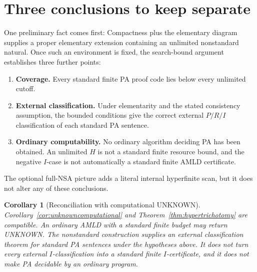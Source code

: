 \documentclass[11pt,openany]{book}
\newtheorem{corollary}[theorem]{Corollary}
\theoremstyle{definition}
\theoremstyle{remark}
\begin{document}
\section{Three conclusions to keep separate}
One preliminary fact comes first: Compactness plus the elementary diagram supplies a proper elementary extension containing an unlimited nonstandard natural. Once such an environment is fixed, the search-bound argument establishes three further points:
\begin{enumerate}
\item \textbf{Coverage.} Every standard finite PA proof code lies below every unlimited cutoff.
\item \textbf{External classification.} Under elementarity and the stated consistency assumption, the bounded conditions give the correct external \(P/R/I\) classification of each standard PA sentence.
\item \textbf{Ordinary computability.} No ordinary algorithm deciding PA has been obtained. An unlimited \(H\) is not a standard finite resource bound, and the negative \(I\)-case is not automatically a standard finite AMLD certificate.
\end{enumerate}
The optional full-NSA picture adds a literal internal hyperfinite scan, but it does not alter any of these conclusions.

\begin{corollary}[Reconciliation with computational UNKNOWN]\label{cor:unknownhyper}
Corollary~\ref{cor:unknowncomputational} and Theorem~\ref{thm:hypertrichotomy} are compatible. An ordinary AMLD with a standard finite budget may return \textsf{UNKNOWN}. The nonstandard construction supplies an external classification theorem for standard PA sentences under the hypotheses above. It does not turn every external \(I\)-classification into a standard finite \(I\)-certificate, and it does not make PA decidable by an ordinary program.
\end{corollary}
\end{document}
